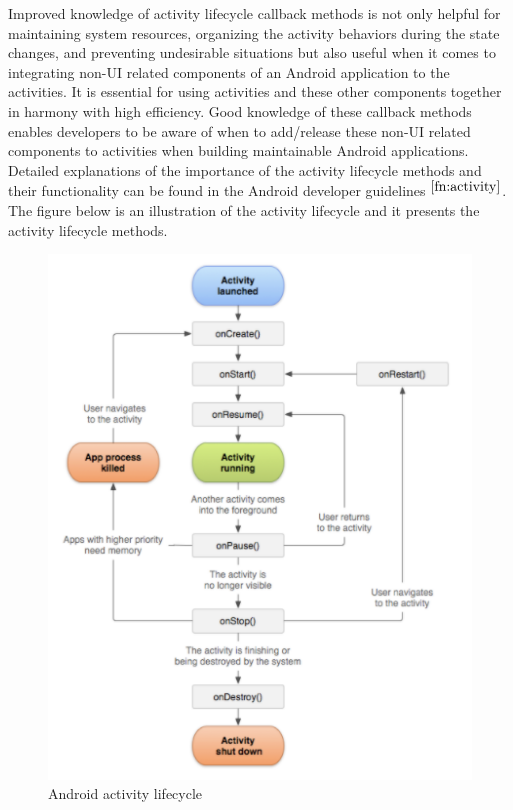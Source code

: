 Improved knowledge of activity lifecycle callback methods is not only helpful for maintaining system resources, organizing the activity behaviors during the state changes, and preventing undesirable situations but also useful when it comes to integrating non-UI related components of an Android application to the activities. It is essential for using activities and these other components together in harmony with high efficiency. Good knowledge of these callback methods enables developers to be aware of when to add/release these non-UI related components to activities when building maintainable Android applications. Detailed explanations of the importance of the activity lifecycle methods and their functionality can be found in the Android developer guidelines $^{\ref{fn:activity}}$. The figure below is an illustration of the activity lifecycle and it presents the activity lifecycle methods. 

\begin{figure}[ht!]
    \centering
    \includegraphics[scale=0.7]{figures/activity_lifecycle.png}
    \caption{Android activity lifecycle \protect\footnotemark}
    \label{fig:android_activity_life_cycle}
\end{figure}
\FloatBarrier